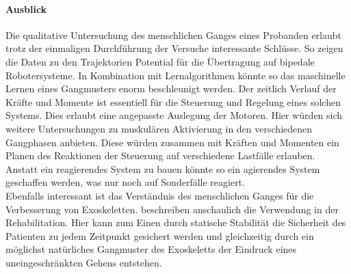 \paragraph*{Ausblick}
Die qualitative Untersuchung des menschlichen Ganges eines Probanden erlaubt trotz der einmaligen Durchführung der Versuche interessante Schlüsse. So zeigen die Daten zu den Trajektorien Potential für die Übertragung auf bipedale Robotersysteme. In Kombination mit Lernalgorithmen könnte so das maschinelle Lernen eines Gangmusters enorm beschleunigt werden. Der zeitlich Verlauf der Kräfte und Momente ist essentiell für die Steuerung und Regelung eines solchen Systems. Dies erlaubt eine angepasste Auslegung der Motoren. Hier würden sich weitere Untersuchungen zu muskulären Aktivierung in den verschiedenen Gangphasen anbieten. Diese würden zusammen mit Kräften und Momenten ein Planen des Reaktionen der Steuerung auf verschiedene Lastfälle erlauben. Anstatt ein reagierendes System zu bauen könnte so ein agierendes System geschaffen werden, was nur noch auf Sonderfälle reagiert.\\
Ebenfalls interessant ist das Verständnis des menschlichen Ganges für die Verbesserung von Exoskeletten. \textcite{barbareschi2015statically} beschreiben anschaulich die Verwendung in der Rehabilitation. Hier kann zum Einen durch statische Stabilität die Sicherheit des Patienten zu jedem Zeitpunkt gesichert werden und gleichzeitig durch ein möglichst natürliches Gangmuster des Exoskeletts der Eindruck eines uneingeschränkten Gehens entstehen.
